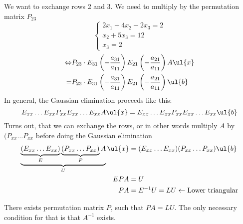 \begin{example}
We want to exchange rows 2 and 3. We need to multiply by the permutation matrix $P_{23}$
\[
\begin{cases}
2x_1 + 4x_2 -2x_3 = 2\\
x_2 + 5x_3 = 12\\
x_3 = 2
\end{cases}
\]
\begin{align*}
\Leftrightarrow &P_{23}\cdot E_{31}\left( -\frac{a_{31}}{a_{11}}\right)E_{21}\left( -\frac{a_{21}}{a_{11}}\right)A\ul{x} \\
= & P_{23}\cdot E_{31}\left( -\frac{a_{31}}{a_{11}}\right)E_{21}\left( -\frac{a_{21}}{a_{11}}\right)\ul{b}
\end{align*} 
In general, the Gaussian elimination proceeds like this:
\[
E_{xx}\dots E_{xx}P_{xx}E_{xx} \dots  E_{xx}A\ul{x} = E_{xx}\dots E_{xx}P_{xx}E_{xx}\dots E_{xx}\ul{b}
\]
Turns out, that we can exchange the rows, or in other words multiply $A$ by $(P_{xx}\dots P_{xx}$ before doing the Gaussian elimination
\begin{align*}
\underbrace{\underbrace{(E_{xx}\dots E_{xx})}_{E}\underbrace{(P_{xx}\dots P_{xx})}_{P}A}_{U}\ul{x} &= (E_{xx}\dots E_{xx})(P_{xx}\dots P_{xx})\ul{b} \\
EPA &= U\\
PA &= E^{-1} U = LU \leftarrow \text{Lower triangular}
\end{align*}
\end{example}
\begin{theorem}
There exists permutation matrix $P$, such that $PA = LU$. The only necessary condition for that is that $A^{-1}$ exists.
\end{theorem}
